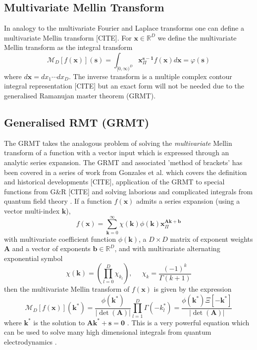 \documentclass[journal=jcisd8,manuscript=article,layout=onecolumn,pdftex,floatfix,amsmath,amssymb,10pt]{achemso}
\begin{document}
\subsection{Multivariate Mellin Transform}
In analogy to the multivariate Fourier and Laplace transforms one can define a multivariate Mellin transform [CITE]. For $\mathbf{x} \in \mathbb{R}^D$ we define the multivariate Mellin transform as the integral transform
\begin{equation}
\mathcal{M}_D[f(\mathbf{x})](\mathbf{s}) = \int_{[0,\infty)^D} \mathbf{x}^\mathbf{s-1}_\Pi f(\mathbf{x}) d \mathbf{x} = \varphi(\mathbf{s})
\end{equation}
where $d\mathbf{x} = dx_1 \cdots dx_D$. The inverse transform is a multiple complex contour integral representation [CITE] but an exact form will not be needed due to the generalised Ramanujan master theorem (GRMT).

\subsection{Generalised RMT (GRMT)}
The GRMT takes the analogous problem of solving the \textit{multivariate} Mellin transform of a function with a vector input which is expressed through an analytic series expansion. The GRMT and associated 'method of brackets' has been covered in a series of work from {\color{red}Gonzales et al.} \citep{Gonzalez2015} which covers the definition and historical developments [CITE], application of the GRMT to special functions from G\&R [CITE] and solving laborious and complicated integrals from quantum field theory \citep{Gonzalez2011}. If a function $f(\mathbf{x})$ admits a series expansion (using a vector multi-index $\mathbf{k}$),  \begin{equation}
f(\mathbf{x}) = \sum_{\mathbf{k}=0}^\infty \chi(\mathbf{k}) \phi(\mathbf{k}) \mathbf{x}^{\mathbf{A}\mathbf{k}+ \mathbf{b}}_\Pi
\end{equation}
with multivariate coefficient function $\phi(\mathbf{k})$, a $D\times D$ matrix of exponent weights $\mathbf{A}$ and a vector of exponents $\mathbf{b} \in \mathbb{R}^D$, and with multivariate alternating exponential symbol
\begin{equation}
\chi(\mathbf{k}) = \left(\prod_{l=0}^D \chi_{k_l}\right),\;\;\;\;\; \chi_k = \frac{(-1)^k}{\Gamma(k+1)}
\end{equation}
then the multivariate Mellin transform of $f(\mathbf{x})$ is given by the expression \begin{equation}
\mathcal{M}_D[f(\mathbf{x})](\mathbf{k}^*) = \frac{\phi(\mathbf{k}^*)}{|\det(\mathbf{A})|} \prod_{l=1}^D \Gamma(-k_l^*) = \frac{\phi(\mathbf{k}^*)\Xi[-\mathbf{k}^*]}{|\det(\mathbf{A})|}
\end{equation}
where $\mathbf{k}^*$ is the solution to $\mathbf{A}\mathbf{k^*}+\mathbf{s}=\mathbf{0}$ \citep{Gonzalez2015}. This is a very powerful equation which can be used to solve many high dimensional integrals from quantum electrodynamics \citep{Gonzalez2011}.
\end{document}
